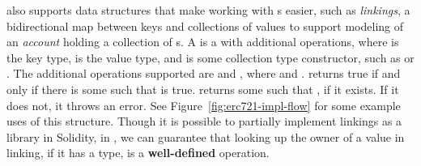 \documentclass[dvipsnames, usenames, sigconf]{acmart}
\begin{document}
\langName also supports data structures that make working with \assetTxt{}s easier, such as \emph{linkings}, a bidirectional map between keys and collections of values to support modeling of an \emph{account} holding a collection of \assetTxt{}s.
A  is a  with additional operations, where  is the key type,  is the value type, and  is some collection type constructor, such as  or .
The additional operations supported are  and , where  and .
 returns true if and only if there is some  such that  is true.
 returns some  such that , if it exists.
If it does not, it throws an error.
See Figure~\ref{fig:erc721-impl-flow} for some example uses of this structure.
Though it is possible to partially implement linkings as a library in Solidity, in \langName, we can guarantee that looking up the owner of a value in linking, if it has a  type, is a \textbf{well-defined} operation.
\end{document}
